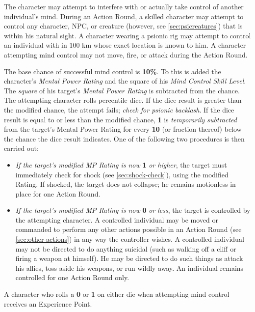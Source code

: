 \label{sec:skill-mind-control}

The character may attempt to interfere with or actually take control
of another individual's mind.  During an Action Round, a skilled
character may attempt to control any character, NPC, or creature
(however, see \ref{sec:psicreatures}) that is within his natural
sight.  A character wearing a psionic rig may attempt to control an
individual with in 100 km whose exact location is known to him.  A
character attempting mind control may not move, fire, or attack during
the Action Round.

The base chance of successful mind control is \textbf{10\%}.  To this
is added the character's \emph{Mental Power Rating} and the square of
his \emph{Mind Control Skill Level}.  The \emph{square} of his
target's \emph{Mental Power Rating} is subtracted from the chance.  The
attempting character rolls percentile dice.  If the dice result is
greater than the modified chance, the attempt fails; \emph{check for
  psionic backlash}.  If the dice result is equal to or less than the
modified chance, \textbf{1} is \emph{temporarily subtracted} from the
target's Mental Power Rating for every \textbf{10} (or fraction
thereof) below the chance the dice result indicates.  One of the
following two procedures is then carried out:

\begin{itemize}
\item \emph{If the target's modified MP Rating is now} \textbf{1}
  \emph{or higher}, the target must immediately check for shock (see
  \ref{sec:shock-check}), using the modified Rating.  If shocked, the
  target does not collapse; he remains motionless in place for one
  Action Round.
\item \emph{If the target's modified MP Rating is now} \textbf{0}
  \emph{or less}, the target is controlled by the attempting
  character.  A controlled individual may be moved or commanded to
  perform any other actions possible in an Action Round (see
  \ref{sec:other-actions}) in any way the controller wishes.  A
  controlled individual may not be directed to do anything suicidal
  (such as walking off a cliff or firing a weapon at himself).  He may
  be directed to do such things as attack his allies, toss aside his
  weapons, or run wildly away.  An individual remains controlled for
  one Action Round only.
\end{itemize}

A character who rolls a \textbf{0} or \textbf{1} on either die when
attempting mind control receives an Experience Point.

